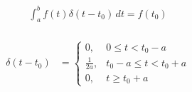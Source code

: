 \documentclass[12pt]{article}
\begin{document}
\begin{multicols}{2}

  \begin{equation*}
    \begin{split}
      \int_a^b f(t)\delta(t-t_0)\,dt=f(t_0)\\
    \end{split}
    \label{13}
  \end{equation*}

  \begin{equation*}
    \begin{split}
      \delta(t-t_0)&=\left\{\begin{array}{ll} 0, & 0\leq t <t_0-a\\ \frac{1}{2a}, & t_0-a\leq t < t_0+a\\ 0, & t\geq t_0+a \end{array}
    \end{split}
    \label{14}
  \end{equation*}

\end{multicols}
\end{document}
